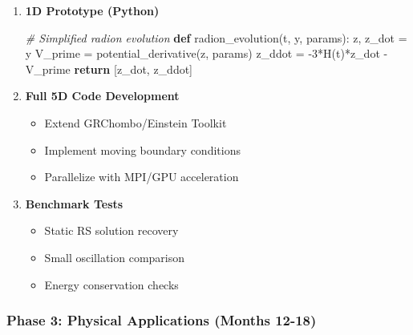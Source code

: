 \documentclass[
  11pt,
]{report}
\newenvironment{Shaded}{}{}
\newcommand{\CommentTok}[1]{\textcolor[rgb]{0.38,0.63,0.69}{\textit{#1}}}
\newcommand{\ControlFlowTok}[1]{\textcolor[rgb]{0.00,0.44,0.13}{\textbf{#1}}}
\newcommand{\DecValTok}[1]{\textcolor[rgb]{0.25,0.63,0.44}{#1}}
\newcommand{\KeywordTok}[1]{\textcolor[rgb]{0.00,0.44,0.13}{\textbf{#1}}}
\newcommand{\NormalTok}[1]{#1}
\newcommand{\OperatorTok}[1]{\textcolor[rgb]{0.40,0.40,0.40}{#1}}
\providecommand{\tightlist}{%
  \setlength{\itemsep}{0pt}\setlength{\parskip}{0pt}}
\begin{document}
\begin{enumerate}
\def\labelenumi{\arabic{enumi}.}
\item
  \textbf{1D Prototype (Python)}

\begin{Shaded}
\begin{Highlighting}[]
\CommentTok{\# Simplified radion evolution}
\KeywordTok{def}\NormalTok{ radion\_evolution(t, y, params):}
\NormalTok{    z, z\_dot }\OperatorTok{=}\NormalTok{ y}
\NormalTok{    V\_prime }\OperatorTok{=}\NormalTok{ potential\_derivative(z, params)}
\NormalTok{    z\_ddot }\OperatorTok{=} \OperatorTok{{-}}\DecValTok{3}\OperatorTok{*}\NormalTok{H(t)}\OperatorTok{*}\NormalTok{z\_dot }\OperatorTok{{-}}\NormalTok{ V\_prime}
    \ControlFlowTok{return}\NormalTok{ [z\_dot, z\_ddot]}
\end{Highlighting}
\end{Shaded}
\item
  \textbf{Full 5D Code Development}

  \begin{itemize}
  \tightlist
  \item
    Extend GRChombo/Einstein Toolkit
  \item
    Implement moving boundary conditions
  \item
    Parallelize with MPI/GPU acceleration
  \end{itemize}
\item
  \textbf{Benchmark Tests}

  \begin{itemize}
  \tightlist
  \item
    Static RS solution recovery
  \item
    Small oscillation comparison
  \item
    Energy conservation checks
  \end{itemize}
\end{enumerate}

\subsubsection{Phase 3: Physical Applications (Months
12-18)}\label{phase-3-physical-applications-months-12-18}
\end{document}
